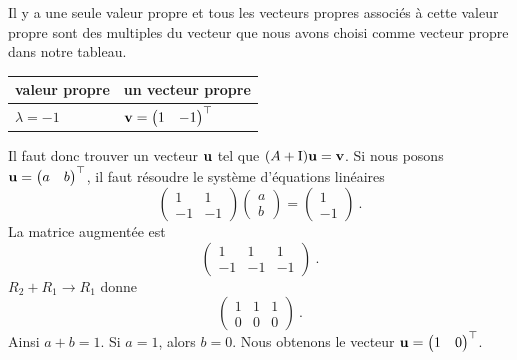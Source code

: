 { Il y a une seule valeur propre et tous les vecteurs
propres associés à cette valeur propre sont des multiples du vecteur
que nous avons choisi comme vecteur propre dans notre tableau.
\begin{center}
\begin{tabular}{l|l}
valeur propre & un vecteur propre \\
\hline
\rule{0em}{1.4em}
$\lambda = -1$ &
$\displaystyle \mathbf{v} =\begin{pmatrix} 1 & -1 \end{pmatrix}^\top$
\end{tabular}
\end{center}
Il faut donc trouver un vecteur $\mathbf{u}$ tel que $(A+\operatorname{I})\mathbf{u} = \mathbf{v}$.
Si nous posons
$\displaystyle \mathbf{u} = \begin{pmatrix} a & b \end{pmatrix}^\top$, il
faut résoudre le système d'équations linéaires
\[
\begin{pmatrix} 1 & 1 \\ -1 & -1 \end{pmatrix}
\begin{pmatrix} a \\ b \end{pmatrix} =
\begin{pmatrix} 1 \\ -1 \end{pmatrix} \ .
\]
La matrice augmentée est
\[
\left(
\begin{array}{cc|c}
1 & 1 & 1 \\
-1 & -1 & -1
\end{array}\right) \ .
\]
$R_2+R_1 \rightarrow R_1$ donne
\[
\left(
\begin{array}{cc|c}
1 & 1 & 1 \\
0 & 0 & 0
\end{array}\right) \ .
\]
Ainsi $a + b = 1$.  Si $a=1$, alors $b=0$.  Nous obtenons le vecteur
$\displaystyle \mathbf{u} = \begin{pmatrix} 1 & 0 \end{pmatrix}^\top$.

}
